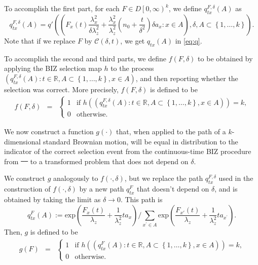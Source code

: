 \documentclass{wscpaperproc}
\theoremstyle{wsc}
\providecommand{\DIFaddtex}[1]{{\protect\color{blue}\uwave{#1}}} %
\providecommand{\DIFdeltex}[1]{{\protect\color{red}\sout{#1}}}                      %
\providecommand{\DIFaddbegin}{} %
\providecommand{\DIFaddend}{} %
\providecommand{\DIFdelbegin}{} %
\providecommand{\DIFdelend}{} %
\providecommand{\DIFadd}[1]{\texorpdfstring{\DIFaddtex{#1}}{#1}} %
\providecommand{\DIFdel}[1]{\texorpdfstring{\DIFdeltex{#1}}{}} %
\begin{document}
To accomplish the first part, for each $F\in D\left[0,\infty\right)^{k}$, 
we define $q_{tx}^{F,\delta}\left(A\right)$ as
\[
q_{tx}^{F,\delta}\left(A\right)=q'\left(\left(F_{x}\left(t\right)\frac{\lambda_{x}^{2}}{\delta\lambda_{z}^{2}}+\frac{\lambda_{x}^{2}}{\lambda_{z}^{2}}\left(n_{0}+\frac{t}{\delta^{2}}\right)\delta a_{x}:x\in A\right),\delta,A\subset\left\{ 1,\ldots,k\right\} \right).
\]
Note that if we replace $F$ by $\mathcal{C}\left(\delta,t\right)$,
we get $q_{tx}\left(A\right)$ in \eqref{eq:q}.   


To accomplish the second and third parts, we define
$f\left(F,\delta\right)$ to be obtained by applying the BIZ selection map $h$ to the process
$\left(q_{tx}^{F,\delta}\left(A\right):t\in\mathbb{R},A\subset\left\{ 1,\ldots,k\right\} ,x\in A\right)$, and then reporting whether the selection was correct.
More precisely, $f(F,\delta)$ is defined to be
\begin{eqnarray*}
f\left(F,\delta\right) & = & \begin{cases}
    1 & \text{if $h\left(\left(q_{tx}^{F,\delta}\left(A\right):t\in\mathbb{R},A\subset\left\{ 1,\ldots,k\right\} ,x\in A\right)\right) = k$,}\\
0 & \text{otherwise.}
\end{cases}
\end{eqnarray*}

We now construct a function $g(\cdot)$ that, when applied to the path of a $k$-dimensional standard Brownian motion, will be equal in distribution to the indicator of the correct selection event from the continuous-time BIZ procedure from \DIFdelbegin \DIFdel{\mbox{%
\cite{Frazier:BIZ}
}%
}\DIFdelend \DIFaddbegin \DIFadd{\mbox{%
}%
}\DIFaddend to a transformed problem that does not depend on $\delta$.

We construct $g$ analogously to $f(\cdot,\delta)$, but we replace the path $q_{tx}^{F,\delta}$ used in the construction of $f(\cdot,\delta)$ by a new path $q_{tx}^{F}$ that doesn't depend on $\delta$, and is obtained by taking the limit as $\delta\to0$.  This path is
\[
q_{tx}^{F}\left(A\right):=\mbox{exp}\left(\frac{F_{x}\left(t\right)}{\lambda_{z}}+\frac{1}{\lambda_{z}^{2}}ta_{x}\right)/\sum_{x^{'}\in A}\mbox{exp}\left(\frac{F_{x'}\left(t\right)}{\lambda_{z}}+\frac{1}{\lambda_{z}^{2}}ta_{x^{'}}\right).
\]
Then, $g$ is defined to be
\begin{eqnarray*}
g\left(F\right) & = & \begin{cases}
    1 & \text{if $h\left(\left(q_{tx}^{F}\left(A\right):t\in\mathbb{R},A\subset\left\{ 1,\ldots,k\right\} ,x\in A\right)\right) = k$,}\\
0 & \text{otherwise.}
\end{cases}
\end{eqnarray*}
\end{document}
